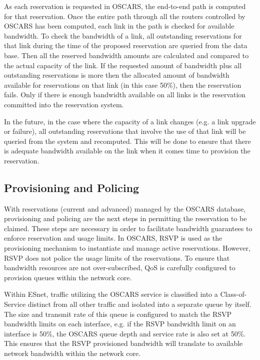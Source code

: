 \documentclass[conference]{IEEEtran}
\begin{document}
As each reservation is requested in OSCARS, the end-to-end path is
computed for that reservation. Once the entire path through all the routers
controlled by OSCARS has been computed, each link in the path is checked for
available bandwidth. To check the bandwidth of a link, all outstanding
reservations for that link during the time of the proposed reservation are
queried from the data base. Then all the reserved bandwidth amounts are
calculated and compared to the actual capacity of the link. If the requested
amount of bandwidth plus all outstanding reservations is more then the 
allocated amount of bandwidth available for reservations on that link (in 
this case 50\%), then the reservation fails. Only if there is enough bandwidth 
available on all links is the reservation committed into the reservation 
system.

In the future, in the case where the capacity of a link changes (e.g. a link 
upgrade or failure), all outstanding reservations
that involve the use of that link will be queried from the system and 
recomputed.
This will be done to ensure that there is adequate bandwidth available on the
link when it comes time to provision the reservation.

\subsection{Provisioning and Policing}
With reservations (current and advanced) managed by the OSCARS database, 
provisioning and policing are the next steps in permitting the reservation to
be claimed. These steps are necessary in order to facilitate bandwidth 
guarantees to enforce reservation and usage limits.  In OSCARS, RSVP is used 
as the provisioning mechanism to instantiate and manage active reservations. 
However, RSVP does not police the usage limits of the reservations.  To
ensure that bandwidth resources are not over-subscribed, QoS is carefully 
configured to provision queues within the network core.

Within ESnet, traffic 
utilizing the OSCARS service is classified into a Class-of-Service distinct 
from all other traffic and isolated into a separate queue by itself.  The size 
and transmit rate of this queue is configured to match the RSVP bandwidth 
limits on each interface, e.g. if the RSVP bandwidth limit on an interface is 
50\%, the OSCARS queue depth and service rate is also set at 50\%.  This 
ensures that the RSVP provisioned bandwidth will translate to available 
network bandwidth within the network core.
\end{document}

